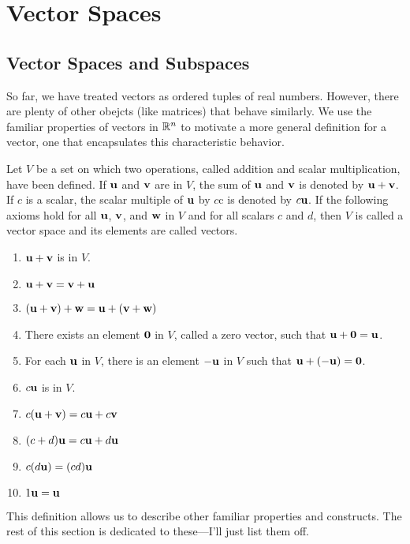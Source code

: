 \documentclass[../m073main.tex]{subfiles}
\begin{document}
\chapter{Vector Spaces}
\section{Vector Spaces and Subspaces}
So far, we have treated vectors as ordered tuples of real numbers.
However, there are plenty of other obejcts (like matrices) that behave similarly.
We use the familiar properties of vectors in $\mathbb{R}^n$ to motivate a more general definition for a vector, one that encapsulates this characteristic behavior.

\begin{definition}
	Let $V$ be a set on which two operations, called addition and scalar multiplication, have been defined.
	If $\mathbf{u}$ and $\mathbf{v}$ are in $V$, the sum of $\mathbf{u}$ and $\mathbf{v}$ is denoted by $\mathbf{u} + \mathbf{v}$.
	If $c$ is a scalar, the scalar multiple of $\mathbf{u}$ by $c$c is denoted by $c \mathbf{u}$.
	If the following axioms hold for all $\mathbf{u}$, $\mathbf{v}$, and $\mathbf{w}$ in $V$ and for all scalars $c$ and $d$, then $V$ is called a vector space and its elements are called vectors.
	\begin{enumerate}
		\item $\mathbf{u} + \mathbf{v}$ is in $V$.
		\item $\mathbf{u} + \mathbf{v} = \mathbf{v} + \mathbf{u}$
		\item $(\mathbf{u} + \mathbf{v}) + \mathbf{w} = \mathbf{u} + (\mathbf{v} + \mathbf{w})$
		\item There exists an element $\mathbf{0}$ in $V$, called a zero vector, such that $\mathbf{u} + \mathbf{0} = \mathbf{u}$.
		\item For each $\mathbf{u}$ in $V$, there is an element $-\mathbf{u}$ in $V$ such that $\mathbf{u} + (-\mathbf{u}) = \mathbf{0}$.
		\item $c \mathbf{u}$ is in $V$.
		\item $c(\mathbf{u} + \mathbf{v}) = c \mathbf{u} + c \mathbf{v}$
		\item $(c + d) \mathbf{u} = c \mathbf{u} + d \mathbf{u}$
		\item $c(d \mathbf{u}) = (cd) \mathbf{u}$
		\item $1 \mathbf{u} = \mathbf{u}$
	\end{enumerate}
\end{definition}

This definition allows us to describe other familiar properties and constructs.
The rest of this section is dedicated to these---I'll just list them off.
\end{document}
